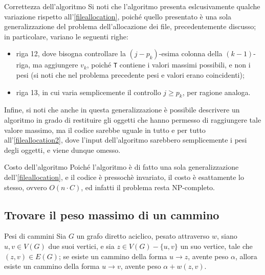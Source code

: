 \documentclass[a4paper, 12pt]{report}
\begin{document}
    \begin{framedobs}{Correttezza dell'algoritmo}
        Si noti che l'algoritmo presenta eslcusivamente qualche variazione rispetto all'\cref{fileallocation}, poiché quello presentato è una sola generalizzazione del problema dell'allocazione dei file, precedentemente discusso; in particolare, variano le seguenti righe:

        \begin{itemize}
            \item riga 12, dove bisogna controllare la $(j - p_k)$-esima colonna della $(k -1)$-riga, ma aggiungere $v_k$, poiché \texttt{T} contiene i valori massimi possibili, e non i pesi (si noti che nel problema precedente pesi e valori erano coincidenti);
            \item riga 13, in cui varia semplicemente il controllo $j \ge p_k$, per ragione analoga.
        \end{itemize}

        Infine, si noti che anche in questa generalizzazione è possibile descrivere un algoritmo in grado di restituire gli oggetti che hanno permesso di raggiungere tale valore massimo, ma il codice sarebbe uguale in tutto e per tutto all'\cref{fileallocation2}, dove l'input dell'algoritmo sarebbero semplicemente i pesi degli oggetti, e viene dunque omesso.
    \end{framedobs}

    \begin{framedobs}{Costo dell'algoritmo}
        Poiché l'algoritmo è di fatto una sola generalizzazione dell'\cref{fileallocation}, e il codice è pressochè invariato, il costo è esattamente lo stesso, ovvero $O(n \cdot C)$, ed infatti il problema resta NP-completo.
    \end{framedobs}

    \subsection{Trovare il peso massimo di un cammino}

    \begin{framedlem}{Pesi di cammini}
        \label{lemma grafi max}
        Sia $G$ un grafo diretto aciclico, pesato attraverso $w$, siano $u, v \in V(G)$ due suoi vertici, e sia $z \in V(G) - \{u, v\}$ un suo vertice, tale che $(z, v) \in E(G)$; se esiste un cammino della forma $u \rightarrow z$, avente peso $\alpha$, allora esiste un cammino della forma $u \rightarrow v$, avente peso $\alpha + w(z, v)$.
    \end{framedlem}
\end{document}
